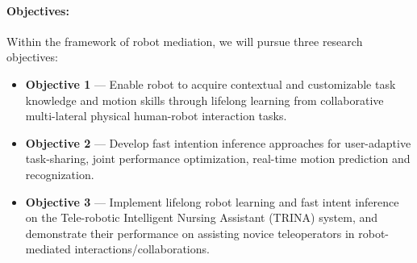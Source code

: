 \documentclass[letterpaper, 11 pt, onecolumn]{article}
\begin{document}
\paragraph*{Objectives:} Within the framework of robot mediation, we will pursue three research objectives: 


\begin{itemize}
\item \textbf{Objective 1} --- Enable robot to acquire contextual and customizable task knowledge and motion skills through lifelong learning from collaborative multi-lateral physical human-robot interaction tasks. 



\item \textbf{Objective 2} --- Develop fast intention inference approaches for user-adaptive task-sharing, joint performance optimization, real-time motion prediction and recognization. 


\item \textbf{Objective 3} --- Implement lifelong robot learning and fast intent inference on the Tele-robotic Intelligent Nursing Assistant (TRINA) system, and demonstrate their performance on assisting novice teleoperators in robot-mediated interactions/collaborations.  

\end{itemize}
\end{document}

